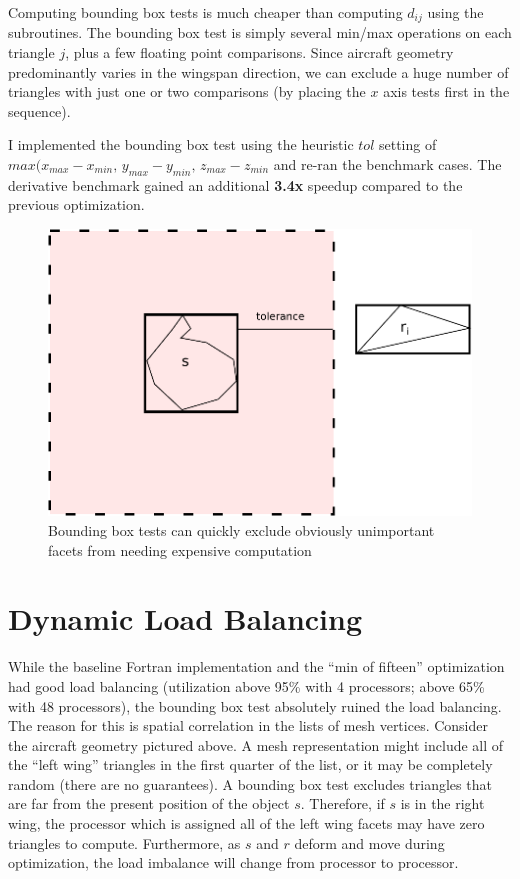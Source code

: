 \documentclass[11pt,letterpaper]{article}
\begin{document}
Computing bounding box tests is much cheaper than computing $d_{ij}$ using the subroutines.
The bounding box test is simply several min/max operations on each triangle $j$, plus a few floating point comparisons.
Since aircraft geometry predominantly varies in the wingspan direction, we can exclude a huge number of triangles with just one or two comparisons (by placing the $x$ axis tests first in the sequence).

I implemented the bounding box test using the heuristic $tol$ setting of $max(x_{max}-x_{min},\,y_{max}-y_{min},\,z_{max}-z_{min}$ and re-ran the benchmark cases.
The derivative benchmark gained an additional \textbf{3.4x} speedup compared to the previous optimization.

\begin{figure}[ht]
  \centering
  \includegraphics[width=0.65\linewidth]{figures/bb_test}
  \caption{Bounding box tests can quickly exclude obviously unimportant facets from needing expensive computation}
  \label{fig:bb-test}
\end{figure}

\section{Dynamic Load Balancing}
While the baseline Fortran implementation and the ``min of fifteen'' optimization had good load balancing (utilization above 95\% with 4 processors; above 65\% with 48 processors), the bounding box test absolutely ruined the load balancing.
The reason for this is spatial correlation in the lists of mesh vertices.
Consider the aircraft geometry pictured above.
A mesh representation might include all of the ``left wing'' triangles in the first quarter of the list, or it may be completely random (there are no guarantees).
A bounding box test excludes triangles that are far from the present position of the object $s$.
Therefore, if $s$ is in the right wing, the processor which is assigned all of the left wing facets may have zero triangles to compute.
Furthermore, as $s$ and $r$ deform and move during optimization, the load imbalance will change from processor to processor.
\end{document}
